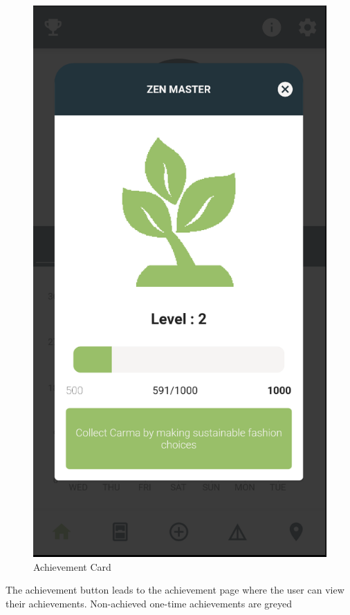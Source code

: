 \documentclass[a4paper, 11pt]{article}
\begin{document}
\begin{figure}[!htbp]
\begin{minipage}[scale=0.45]{0.45\linewidth}
            \centering
            \includegraphics[scale=0.3]{home-achieve-card.png}
            \caption{Achievement Card}
          \end{minipage}
        \end{figure}
        \noindent The achievement button leads to the achievement page where the user can
        view their achievements. Non-achieved one-time achievements are greyed
\end{document}
